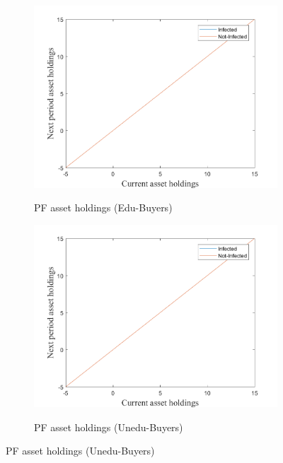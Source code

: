 \begin{figure}[H]\caption{Pre-epidemic stage}
\begin{subfigure}{0.5\textwidth}\caption{PF asset holdings (Edu-Buyers)}
   \includegraphics[width=\linewidth,height = 0.22\textheight]{figures/pre/FIG1.png}
    \label{fig_dert}
\end{subfigure}
\hspace*{\fill}
\begin{subfigure}{0.5\textwidth}\caption{PF asset holdings (Unedu-Buyers)}
   \includegraphics[width=\linewidth,height = 0.22\textheight]{figures/pre/FIG2.png}
    \label{fig:x_b}
\end{subfigure}

\end{figure}
